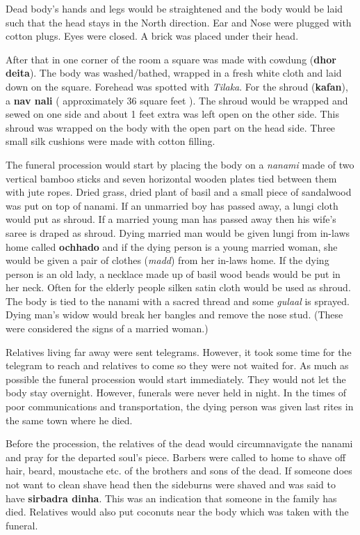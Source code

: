 Dead body's hands and legs would be straightened and the body would be laid
such that the head stays in the North direction. Ear and Nose were plugged with
cotton plugs. Eyes were closed. A brick was placed under their head.

After that in one corner of the room a square was made with cowdung
(\textbf{dhor deita}). The body was washed/bathed, wrapped in a fresh white
cloth and laid down on the square. Forehead was spotted with \textit{Tilaka}.
For the shroud (\textbf{kafan}), a \textbf{nav nali} ( approximately 36 square
feet ). The shroud would be wrapped and sewed on one side and about 1 feet
extra was left open on the other side. This shroud was wrapped on the body with
the open part on the head side. Three small silk cushions were made with cotton
filling.

The funeral procession would start by placing the body on a \textit{nanami} made
of two vertical bamboo sticks and seven horizontal wooden plates tied between
them with jute ropes. Dried grass, dried plant of basil and a small piece of
sandalwood was put on top of nanami. If an unmarried boy has passed away, a
lungi cloth would put as shroud. If a married young man has passed away then
his wife's saree is draped as shroud. Dying married man would be given lungi
from in-laws home called \textbf{ochhado} and if the dying person is a young
married woman, she would be given a pair of clothes (\textit{madd}) from her
in-laws home. If the dying person is an old lady, a necklace made up of basil
wood beads would be put in her neck. Often for the elderly people silken satin
cloth would be used as shroud. The body is tied to the nanami with a sacred
thread and some \textit{gulaal} is sprayed. Dying man's widow would break her
bangles and remove the nose stud. (These were considered the signs of a married
woman.)

Relatives living far away were sent telegrams. However, it took some time for
the telegram to reach and relatives to come so they were not waited for. As
much as possible the funeral procession would start immediately. They would not
let the body stay overnight. However, funerals were never held in night. In the
times of poor communications and transportation, the dying person was given
last rites in the same town where he died.

Before the procession, the relatives of the dead would circumnavigate the
nanami and pray for the departed soul's piece. Barbers were called to home to
shave off hair, beard, moustache etc. of the brothers and sons of the dead. If
someone does not want to clean shave head then the sideburns were shaved and
was said to have \textbf{sirbadra dinha}. This was an indication that someone
in the family has died. Relatives would also put coconuts near the body which
was taken with the funeral.

